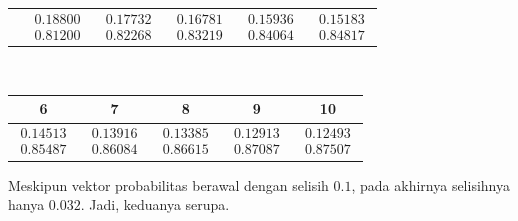 \begin{exercises}
\begin{answer}
\begin{exparts}
\begin{center}
\begin{tabular}{c|ccccc}
               &$\begin{array}{c}   0.18800 \\ 0.81200 \end{array}$
               &$\begin{array}{c}   0.17732 \\ 0.82268 \end{array}$
               &$\begin{array}{c}   0.16781 \\ 0.83219 \end{array}$
               &$\begin{array}{c}   0.15936 \\ 0.84064 \end{array}$
               &$\begin{array}{c}   0.15183 \\ 0.84817 \end{array}$
             \end{tabular}                                         \\[1ex]
             \begin{tabular}{|ccccc}
               6  &7  &8  &9 &10 \\ 
               \hline
               $\begin{array}{c}  0.14513 \\ 0.85487  \end{array}$
               &$\begin{array}{c}  0.13916 \\ 0.86084  \end{array}$
               &$\begin{array}{c}  0.13385 \\ 0.86615  \end{array}$
               &$\begin{array}{c}  0.12913 \\ 0.87087  \end{array}$
               &$\begin{array}{c}  0.12493 \\ 0.87507  \end{array}$
             \end{tabular}
           \end{center}
          \partsitem Meskipun vektor probabilitas berawal dengan selisih $0.1$,
            pada akhirnya selisihnya hanya $0.032$.
            Jadi, keduanya serupa.
       \end{exparts}
     \end{answer}  

\end{exercises}
